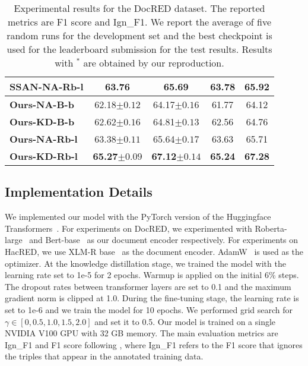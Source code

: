 \documentclass[11pt]{article}
\begin{document}
\begin{table*}
{\begin{tabular}{lcccc}
 \textbf{SSAN-NA-Rb-l}         & 63.76        & 65.69   & 63.78         & 65.92     \\ 
 \hline
   \textbf{Ours-NA-B-b}    & 62.18$\pm{0.12}$	& 64.17$\pm{0.16}$	& 61.77	& 64.12     \\
 \textbf{Ours-KD-B-b}    & 62.62$\pm{0.16}$	& 64.81$\pm{0.13}$	& 62.56  &	 64.76     \\
\textbf{Ours-NA-Rb-l}         & 63.38$\pm{0.11}$        & 65.64$\pm{0.17}$   & 63.63         & 65.71     \\ 
\textbf{Ours-KD-Rb-l}    & \textbf{65.27}$\pm{0.09}$        & \textbf{67.12}$\pm{0.14}$   & \textbf{65.24}         & \textbf{67.28}     \\
\hline
\hline
\end{tabular}}

\caption{Experimental results for the DocRED dataset. The reported metrics are F1 score and Ign\_F1. We report the average of five random runs for the development set and the best checkpoint is used for the leaderboard submission for the test results. Results with $^*$ are obtained by our reproduction.}
\label{tab:docred}
\end{table*}


\subsection{Implementation Details}
We implemented our model with the PyTorch version of the Huggingface Transformers~\citep{wolf2020transformers}. For experiments on DocRED, we experimented with Roberta-large~\citep{liu2019roberta} and Bert-base~\citep{devlin-etal-2019-bert} as our document encoder respectively. For experiments on HacRED, we use XLM-R base~\citep{conneau-etal-2020-unsupervised} as the document encoder. AdamW~\citep{loshchilov2018decoupled} is used as the optimizer. At the knowledge distillation stage, we trained the model with the learning rate set to 1e-5 for 2 epochs. Warmup is applied on the initial 6\% steps. The dropout rates between transformer layers are set to 0.1 and the maximum gradient norm is clipped at 1.0. During the fine-tuning stage, the learning rate is set to 1e-6 and we train the model for 10 epochs. We performed grid search for $\gamma \in [0, 0.5, 1.0, 1.5, 2.0]$ and set it to 0.5. Our model is trained on a single NVIDIA V100 GPU with 32 GB memory. The main evaluation metrics are Ign\_F1 and F1 score following \citet{yao2019docred}, where Ign\_F1 refers to the F1 score that ignores the triples that appear in the annotated training data.
\end{document}
